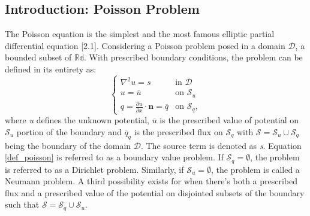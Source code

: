 \documentclass[../main.tex]{subfiles}
\begin{document}
\newtheorem{definition}{Definition}[section]

\subsection{Introduction: Poisson Problem} \label{sec:poisson_weak_form}
The Poisson equation is the simplest and the most famous elliptic partial differential equation [2.1].
Considering a Poisson problem posed in a domain $\mathcal{D}$, a bounded subset of $\mathbb{Rd}$. With prescribed boundary conditions, the problem can be defined in its entirety as:
\begin{equation} \label{def_poisson}
    \begin{cases}
        \nabla ^{2}  u = s  & \text{in $\mathcal{D}$}\\
        u = \overline{u}  & \text{on $\mathcal{S}_{u}$}\\
        q = \frac{\partial u}{\partial x} \cdot \boldsymbol{n} = \overline{q} & \text{on $\mathcal{S}_{q}$},
    \end{cases}
\end{equation}
where \emph{u} defines the unknown potential, $\overline{u}$ is the prescribed value of potential on $\mathcal{S}_{u}$ portion of the boundary and $\overline{q}_{q}$ is the prescribed flux on $\mathcal{S}_{q}$
 with $\mathcal{S} = \mathcal{S}_{u} \cup \mathcal{S}_{q}$ being the boundary of the domain $\mathcal{D}$. The source term is denoted as \emph{s}.
 Equation \eqref{def_poisson} is referred to as a boundary value problem. If $\mathcal{S}_{q} = \emptyset$, the problem is referred to as a Dirichlet problem.
 Similarly, if $\mathcal{S}_{u} = \emptyset$, the problem is called a Neumann problem.
 A third possibility exists for when there's both a prescribed flux and a prescribed value of the potential on disjointed subsets of the boundary such that $\mathcal{S} = \mathcal{S}_{q} \cup \mathcal{S}_{u}$.
\end{document}
